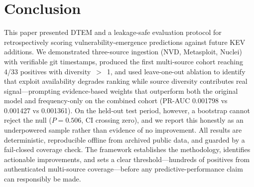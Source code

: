 \documentclass[conference]{IEEEtran}
\begin{document}
\section{Conclusion}
This paper presented DTEM and a leakage-safe evaluation protocol for retrospectively scoring vulnerability-emergence predictions against future KEV additions. We demonstrated three-source ingestion (NVD, Metasploit, Nuclei) with verifiable git timestamps, produced the first multi-source cohort reaching 4/33 positives with diversity~$>$~1, and used leave-one-out ablation to identify that exploit availability degrades ranking while source diversity contributes real signal---prompting evidence-based weights that outperform both the original model and frequency-only on the combined cohort (PR-AUC 0.001798 vs 0.001427 vs 0.001361). On the held-out test period, however, a bootstrap cannot reject the null ($P=0.506$, CI crossing zero), and we report this honestly as an underpowered sample rather than evidence of no improvement. All results are deterministic, reproducible offline from archived public data, and guarded by a fail-closed coverage check. The framework establishes the methodology, identifies actionable improvements, and sets a clear threshold---hundreds of positives from authenticated multi-source coverage---before any predictive-performance claim can responsibly be made.
\end{document}
